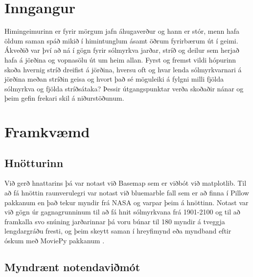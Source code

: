 \documentclass[12pt, git, final]{rureport}
\begin{document}
\maketitle  %


%
\section{Inngangur} %
Himingeimurinn er fyrir mörgum jafn áhugaverður og hann er stór, menn hafa öldum saman spáð mikið í himintunglum ásamt öðrum fyrirbærum út í geimi. Ákveðið var því að ná í gögn fyrir sólmyrkva jarðar, stríð og deilur sem herjað hafa á jörðina og vopnasölu út um heim allan. Fyrst og fremst vildi hópurinn skoða hvernig stríð dreifist á jörðina, hversu oft og hvar lenda sólmyrkvarnari á jörðina meðan stríðin geisa og hvort það sé möguleiki á fylgni milli fjölda sólmyrkva og fjölda stríðsátaka? Þessir útgangspunktar verða skoðaðir nánar og þeim gefin frekari skil á niðurstöðunum.  
\section{Framkvæmd}
\subsection{Hnötturinn}
Við gerð hnattarins þá var notast við Basemap sem er viðbót við matplotlib. Til að fá hnöttin raunverulegri var notast við bluemarble fall sem er að finna í Pillow \cite{pillow} pakkanum en það tekur myndir frá NASA \cite{bluemarble} og varpar þeim á hnöttinn. Notast var við gögn úr gagnagrunninum til að fá hnit sólmyrkvana frá 1901-2100 og til að framkalla svo snúning jarðarinnar þá voru búnar til 180 myndir á tveggja lengdargráðu fresti, og þeim skeytt saman í hreyfimynd eða myndband eftir óskum með MoviePy pakkanum \cite{moviepy}.
 
\subsection{Myndrænt notendaviðmót}
\end{document}
